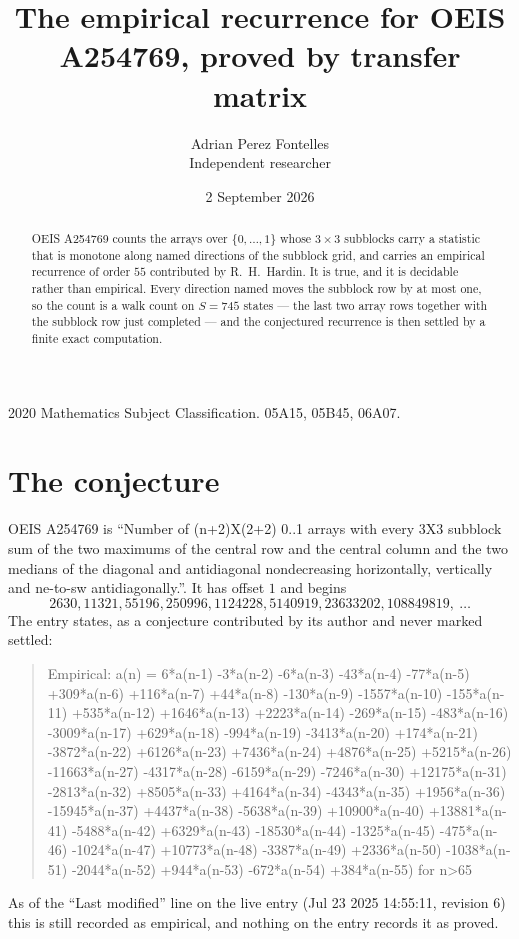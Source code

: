 \documentclass[11pt,a4paper]{article}
\title{The empirical recurrence for OEIS A254769, proved by transfer matrix}
\author{Adrian Perez Fontelles\\ \small Independent researcher}
\date{2 September 2026}
\theoremstyle{plain}
\theoremstyle{definition}
\begin{document}
\maketitle

\begin{abstract}
OEIS A254769 counts the arrays over $\{0,\dots,1\}$ whose $3\times3$ subblocks carry a
statistic that is monotone along named directions of the subblock grid, and carries an
empirical recurrence of order $55$ contributed by R.~H.~Hardin. It is true, and it is
decidable rather than empirical. Every direction named moves the subblock row by at most one,
so the count is a walk count on $S=745$ states --- the last two array rows together with the
subblock row just completed --- and the conjectured recurrence is then settled by a finite
exact computation.
\end{abstract}

\noindent\small 2020 Mathematics Subject Classification. 05A15, 05B45, 06A07.\normalsize

\section{The conjecture}

OEIS A254769 is ``Number of (n+2)X(2+2) 0..1 arrays with every 3X3 subblock sum of the two maximums of the central row and the central column and the two medians of the diagonal and antidiagonal nondecreasing horizontally, vertically and ne-to-sw antidiagonally.''. It has offset $1$ and begins
\[
2630, 11321, 55196, 250996, 1124228, 5140919, 23633202, 108849819,\ \dots
\]
The entry states, as a conjecture contributed by its author and never marked settled:
\begin{quote}
Empirical: a(n) = 6*a(n-1) -3*a(n-2) -6*a(n-3) -43*a(n-4) -77*a(n-5) +309*a(n-6) +116*a(n-7) +44*a(n-8) -130*a(n-9) -1557*a(n-10) -155*a(n-11) +535*a(n-12) +1646*a(n-13) +2223*a(n-14) -269*a(n-15) -483*a(n-16) -3009*a(n-17) +629*a(n-18) -994*a(n-19) -3413*a(n-20) +174*a(n-21) -3872*a(n-22) +6126*a(n-23) +7436*a(n-24) +4876*a(n-25) +5215*a(n-26) -11663*a(n-27) -4317*a(n-28) -6159*a(n-29) -7246*a(n-30) +12175*a(n-31) -2813*a(n-32) +8505*a(n-33) +4164*a(n-34) -4343*a(n-35) +1956*a(n-36) -15945*a(n-37) +4437*a(n-38) -5638*a(n-39) +10900*a(n-40) +13881*a(n-41) -5488*a(n-42) +6329*a(n-43) -18530*a(n-44) -1325*a(n-45) -475*a(n-46) -1024*a(n-47) +10773*a(n-48) -3387*a(n-49) +2336*a(n-50) -1038*a(n-51) -2044*a(n-52) +944*a(n-53) -672*a(n-54) +384*a(n-55) for n>65
\end{quote}
As of the ``Last modified'' line on the live entry (Jul 23 2025 14:55:11, revision 6) this is still
recorded as empirical, and nothing on the entry records it as proved.
\end{document}
